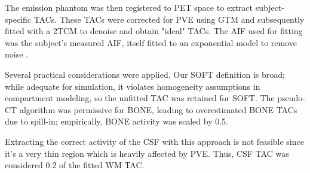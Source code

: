 The emission phantom was then registered to PET space to extract subject-specific TACs.
These TACs were corrected for PVE using GTM and subsequently fitted with a 2TCM to denoise and obtain "ideal" TACs.
The AIF used for fitting was the subject’s measured AIF, itself fitted to an exponential model to remove noise \cite{feng}.

Several practical considerations were applied.
Our SOFT definition is broad; while adequate for simulation, it violates homogeneity assumptions in compartment modeling, so the unfitted TAC was retained for SOFT.
The pseudo-CT algorithm was permissive for BONE, leading to overestimated BONE TACs due to spill-in; empirically, BONE activity was scaled by 0.5.

Extracting the correct activity of the CSF with this approach is not feasible since it's a very thin region which is heavily affected by PVE. Thus, CSF TAC was considered 0.2 of the fitted WM TAC.

